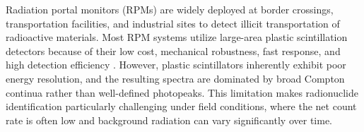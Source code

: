\documentclass[10pt]{wlscirep}
\begin{document}



Radiation portal monitors (RPMs) are widely deployed at border crossings, transportation facilities, and industrial sites to detect illicit transportation of radioactive materials\cite{Sicilliano2005Comparision, Bertrand2014Current, Ely2006EWindow}. Most RPM systems utilize large-area plastic scintillation detectors because of their low cost, mechanical robustness, fast response, and high detection efficiency \cite{Hevener2013EWindow, Lee2020EWeight,Paff2017Spectral}. However, plastic scintillators inherently exhibit poor energy resolution, and the resulting spectra are dominated by broad Compton continua rather than well-defined photopeaks. This limitation makes radionuclide identification particularly challenging under field conditions, where the net count rate is often low and background radiation can vary significantly over time.
\end{document}
